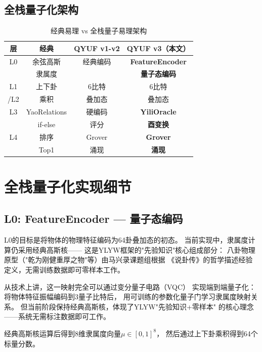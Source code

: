 \documentclass[twocolumn]{article}
\begin{document}
\subsection{全栈量子化架构}

\begin{table}[htbp]
\centering
\caption{经典易理 vs 全栈量子易理架构}
\label{tab:arch}
\begin{tabular}{c|c|c|c}
\toprule
\textbf{层} & \textbf{经典} & \textbf{QYUF v1-v2} & \textbf{QYUF v3（本文）} \\
\midrule
L0 & 余弦高斯 & 经典编码 & \textbf{FeatureEncoder} \\
& 隶属度 & & \textbf{量子态编码} \\
\midrule
L1 & 上下卦 & 6比特 & 6比特 \\
/L2 & 乘积 & 叠加态 & 叠加态 \\
\midrule
L3 & YaoRelations & 硬编码 & \textbf{YiliOracle} \\
& if-else & 评分 & \textbf{酉变换} \\
\midrule
L4 & 排序 & Grover & \textbf{Grover} \\
& Top1 & 涌现 & \textbf{涌现} \\
\bottomrule
\end{tabular}
\end{table}

\section{全栈量子化实现细节}

\subsection{L0: FeatureEncoder — 量子态编码}

L0的目标是将物体的物理特征编码为64卦叠加态的初态。
当前实现中，隶属度计算仍采用经典高斯核——
这是YLYW框架的"先验知识"核心组成部分：
八卦物理原型（"乾为刚健重厚之物"等）由马兴录课题组根据
《说卦传》的哲学描述经验定义，无需训练数据即可零样本工作。

从技术上讲，这一映射完全可以通过变分量子电路（VQC）
实现端到端量子化：将物体特征振幅编码到3量子比特后，
用可训练的参数化量子门学习隶属度映射关系。
但当前阶段保持经典高斯核，体现了YLYW"先验知识+零样本"
的核心理念——系统无需标注数据即可工作。

经典高斯核运算后得到8维隶属度向量$\mu \in [0,1]^8$，
然后通过上下卦乘积得到64个标量分数。
\end{document}
